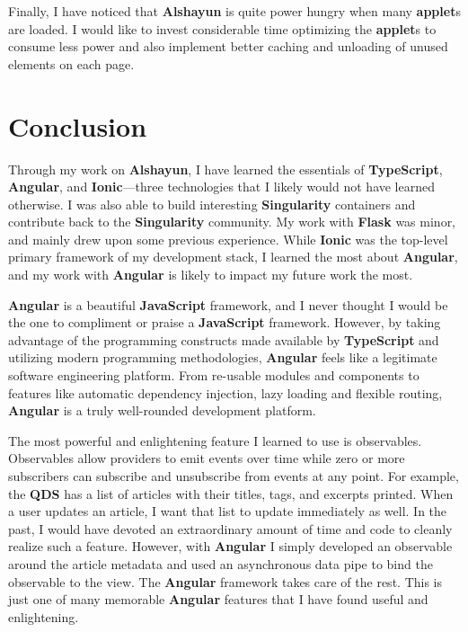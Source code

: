 \documentclass[12pt]{report}
\begin{document}
Finally, I have noticed that \textbf{Alshayun} is quite power hungry when many
\textbf{applet}s are loaded. I would like to invest considerable time optimizing
the \textbf{applet}s to consume less power and also implement better caching and
unloading of unused elements on each page.

\chapter{Conclusion}

Through my work on \textbf{Alshayun}, I have learned the essentials of
\textbf{TypeScript}, \textbf{Angular}, and \textbf{Ionic}---three technologies
that I likely would not have learned otherwise. I was also able to build
interesting \textbf{Singularity} containers and contribute back to the
\textbf{Singularity} community. My work with \textbf{Flask} was minor, and
mainly drew upon some previous experience. While \textbf{Ionic} was the
top-level primary framework of my development stack, I learned the most about
\textbf{Angular}, and my work with \textbf{Angular} is likely to impact my
future work the most.

\textbf{Angular} is a beautiful \textbf{JavaScript} framework, and I never
thought I would be the one to compliment or praise a \textbf{JavaScript}
framework. However, by taking advantage of the programming constructs made
available by \textbf{TypeScript} and utilizing modern programming methodologies,
\textbf{Angular} feels like a legitimate software engineering platform. From
re-usable modules and components to features like automatic dependency
injection, lazy loading and flexible routing, \textbf{Angular} is a truly
well-rounded development platform.

The most powerful and enlightening feature I learned to use is observables.
Observables allow providers to emit events over time while zero or more
subscribers can subscribe and unsubscribe from events at any point. For example,
the \textbf{QDS} has a list of articles with their titles, tags, and excerpts
printed. When a user updates an article, I want that list to update immediately
as well. In the past, I would have devoted an extraordinary amount of time and
code to cleanly realize such a feature. However, with \textbf{Angular} I simply
developed an observable around the article metadata and used an asynchronous
data pipe to bind the observable to the view. The \textbf{Angular} framework
takes care of the rest. This is just one of many memorable \textbf{Angular}
features that I have found useful and enlightening.
\end{document}
